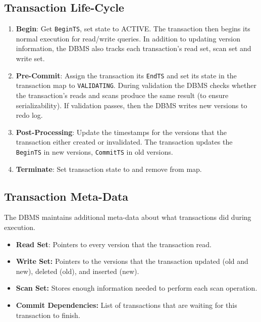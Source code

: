 \documentclass[11pt]{article}
\newcommand{\mvccField}[1]{\texttt{#1}\xspace}
\begin{document}
\subsection*{Transaction Life-Cycle}
\begin{enumerate}
    \item \textbf{Begin}:
    Get \mvccField{BeginTS}, set state to ACTIVE. The transaction then begins its normal 
    execution for read/write queries. In addition to updating version information, the DBMS
    also tracks each transaction's read set, scan set and write set.
    
    \item \textbf{Pre-Commit}:
    Assign the transaction its \mvccField{EndTS} and set its state in the transaction map to 
    \texttt{VALIDATING}. During validation the DBMS checks whether the transaction's reads and 
    scans produce the same result (to ensure serializability). If validation passes, then the DBMS 
    writes new versions to redo log.
    
    \item \textbf{Post-Processing}:
    Update the timestamps for the versions that the transaction either created or 
    invalidated. The transaction updates the \mvccField{BeginTS} in new versions, \texttt{CommitTS} 
    in old versions.
    
    \item \textbf{Terminate}:
    Set transaction state to  and remove from map.
\end{enumerate}

\subsection*{Transaction Meta-Data}
The DBMS maintains additional meta-data about what transactions did during execution.

\begin{itemize}
    \item \textbf{Read Set}:
    Pointers to every version that the transaction read.
    
    \item \textbf{Write Set:}
    Pointers to the versions that the transaction updated (old and new), deleted (old), 
    and inserted (new).
    
    \item \textbf{Scan Set:}
    Stores enough information needed to perform each scan operation.
    
    \item \textbf{Commit Dependencies:}
    List of transactions that are waiting for this transaction to finish.
\end{itemize}
\end{document}
